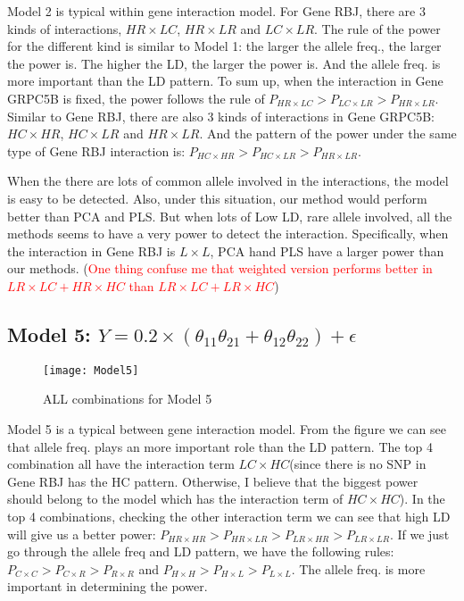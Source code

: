 \documentclass{article}
\begin{document}
        Model 2 is typical within gene interaction model. For Gene RBJ, there are 3 kinds of interactions, $HR\times LC$, $HR\times LR$ and $LC\times LR$. The rule of the power for the different kind is similar to Model 1: the larger the allele freq., the larger the power is. The higher the LD, the larger the power is. And the allele freq. is more important than the LD pattern. To sum up, when the interaction in Gene GRPC5B is fixed, the power follows the rule of $P_{HR\times LC}>P_{LC\times LR}>P_{HR\times LR}$. Similar to Gene RBJ, there are also 3 kinds of interactions in Gene GRPC5B: $HC\times HR$, $HC\times LR$ and $HR\times LR$. And the pattern of the power under the same type of Gene RBJ interaction is: $P_{HC\times HR}>P_{HC\times LR}>P_{HR\times LR}$.

        When the there are lots of common allele involved in the interactions, the model is easy to be detected. Also, under this situation, our method would perform better than PCA and PLS. But when lots of Low LD, rare allele involved, all the methods seems to have a very power to detect the interaction. Specifically, when the interaction in Gene RBJ is $L\times L$, PCA hand PLS have a larger power than our methods. (\textcolor{red}{One thing confuse me that weighted version performs better in $LR\times LC+HR\times HC$ than $LR\times LC+LR\times HC$})

    \subsection{Model 5: $Y=0.2\times(\theta_{11}\theta_{21}+\theta_{12}\theta_{22})+\epsilon$}
    
        \begin{figure}[htbp]
            \centering
            \texttt{[image: Model5]}
            \caption{ALL combinations for Model 5}
        \end{figure}

        Model 5 is a typical between gene interaction model. From the figure we can see that allele freq. plays an more important role than the LD pattern. The top 4 combination all have the interaction term $LC\times HC$(since there is no SNP in Gene RBJ has the HC pattern. Otherwise, I believe that the biggest power should belong to the model which has the interaction term of $HC\times HC$). In the top 4 combinations, checking the other interaction term we can see that high LD will give us a better power: $P_{HR\times HR}>P_{HR\times LR}>P_{LR\times HR}>P_{LR\times LR}$. If we just go through the allele freq and LD pattern, we have the following rules: $P_{C\times C}>P_{C\times R}>P_{R\times R}$ and $P_{H\times H}>P_{H\times L}>P_{L\times L}$. The allele freq. is more important in determining the power.
\end{document}
